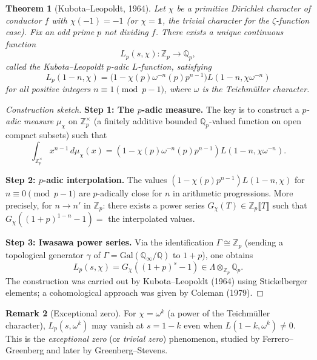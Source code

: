 \documentclass[12pt,a4paper]{amsart}
\newtheorem{theorem}{Theorem}[section]
\theoremstyle{definition}
\newtheorem{remark}[theorem]{Remark}
\newcommand{\Q}{\mathbb{Q}}
\newcommand{\Zp}{\mathbb{Z}_p}
\newcommand{\Qp}{\mathbb{Q}_p}
\newcommand{\Gal}{\mathrm{Gal}}
\begin{document}
\begin{theorem}[Kubota--Leopoldt, 1964]
\label{thm:kubota_leopoldt}
Let $\chi$ be a primitive Dirichlet character of conductor $f$ with
$\chi(-1) = -1$ (or $\chi = \mathbf{1}$, the trivial character for the
$\zeta$-function case).  Fix an odd prime $p$ not dividing $f$.
There exists a unique continuous function
\[
  L_p(s, \chi) : \Zp \longrightarrow \Qp,
\]
called the \emph{Kubota--Leopoldt $p$-adic $L$-function}, satisfying
\[
  L_p(1-n, \chi) = \bigl(1 - \chi(p)\omega^{-n}(p) p^{n-1}\bigr)
                   L(1-n, \chi\omega^{-n})
\]
for all positive integers $n \equiv 1 \pmod{p-1}$, where $\omega$ is
the Teichmüller character.
\end{theorem}

\begin{proof}[Construction sketch]
\textbf{Step 1: The $p$-adic measure.}
The key is to construct a \emph{$p$-adic measure} $\mu_\chi$ on $\Zp^\times$
(a finitely additive bounded $\Qp$-valued function on open compact subsets)
such that
\[
  \int_{\Zp^\times} x^{n-1} \, d\mu_\chi(x)
  = (1 - \chi(p)\omega^{-n}(p)p^{n-1}) L(1-n, \chi\omega^{-n}).
\]

\textbf{Step 2: $p$-adic interpolation.}
The values $(1 - \chi(p)p^{n-1}) L(1-n, \chi)$ for $n \equiv 0 \pmod{p-1}$
are $p$-adically close for $n$ in arithmetic progressions.  More precisely,
for $n \to n'$ in $\Zp$: there exists a power series
$G_\chi(T) \in \Zp\llbracket T \rrbracket$ such that
$G_\chi((1+p)^{1-n} - 1) = $ the interpolated values.

\textbf{Step 3: Iwasawa power series.}
Via the identification $\Gamma \cong \Zp$ (sending a topological generator
$\gamma$ of $\Gamma = \Gal(\Q_\infty/\Q)$ to $1+p$), one obtains
\[
  L_p(s, \chi) = G_\chi((1+p)^s - 1) \in \Lambda \otimes_{\Zp} \Qp.
\]
The construction was carried out by Kubota--Leopoldt (1964) using
Stickelberger elements; a cohomological approach was given by Coleman (1979).
\end{proof}

\begin{remark}[Exceptional zero]
For $\chi = \omega^k$ (a power of the Teichmüller character), $L_p(s, \omega^k)$
may vanish at $s = 1-k$ even when $L(1-k, \omega^k) \ne 0$.  This is the
\emph{exceptional zero} (or \emph{trivial zero}) phenomenon, studied by
Ferrero--Greenberg and later by Greenberg--Stevens.
\end{remark}

\end{document}
